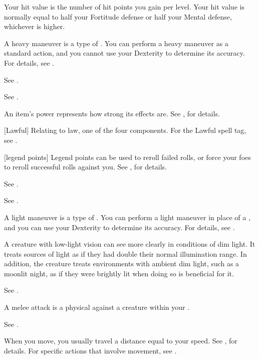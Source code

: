  Your hit value is the number of hit points you gain per level.
Your hit value is normally equal to half your Fortitude defense or half your Mental defense, whichever is higher.

 A heavy maneuver is a type of .
You can perform a heavy maneuver as a standard action, and you cannot use your Dexterity to determine its accuracy.
For details, see .

 See .

 See .

 An item's power represents how strong its effects are.
See , for details.

[Lawful] Relating to law, one of the four  components. For the Lawful spell tag, see .

[legend points] Legend points can be used to reroll failed rolls, or force your foes to reroll successful rolls against you. See , for details.

 See .

 See .

 A light maneuver is a type of .
You can perform a light maneuver in place of a , and you can use your Dexterity to determine its accuracy.
For details, see .

 A creature with low-light vision can see more clearly in conditions of dim light.
It treats sources of light as if they had double their normal illumination range.
In addition, the creature treats environments with ambient dim light, such as a moonlit night, as if they were brightly lit when doing so is beneficial for it.

 See .

 A melee attack is a physical  against a creature within your .

 See .

 When you move, you usually travel a distance equal to your speed.
See , for details.
For specific actions that involve movement, see .


